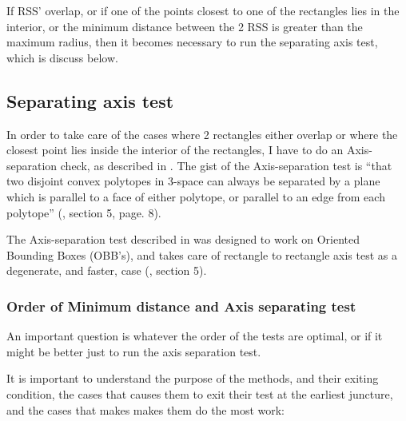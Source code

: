 If RSS' overlap, or if one of the points closest to one of the rectangles lies in the interior, or the minimum distance between the 2 RSS is greater than the maximum radius, then it becomes necessary to run the separating axis test, which is discuss below.

\subsection{Separating axis test}
\label{sepAxis}

In order to take care of the cases where 2 rectangles either overlap or where the closest point lies inside the interior of the rectangles, I have to do an Axis-separation check, as described in \cite{237244}. The gist of the Axis-separation test is ``that two disjoint convex polytopes in 3-space can always be separated by a plane which is parallel to a face of either polytope, or parallel to an edge from each polytope'' (\cite{237244}, section 5, page. 8).

The Axis-separation test described in \cite{237244} was designed to work on Oriented Bounding Boxes (OBB's), and takes care of rectangle to rectangle axis test as a degenerate, and faster, case (\cite{237244}, section 5).

\subsubsection{Order of Minimum distance and Axis separating test}
\label{minAxisOrder}
An important question is whatever the order of the tests are optimal, or if it might be better just to run the axis separation test.

It is important to understand the purpose of the methods, and their exiting condition, the cases that causes them to exit their test at the earliest juncture, and the cases that makes makes them do the most work:

